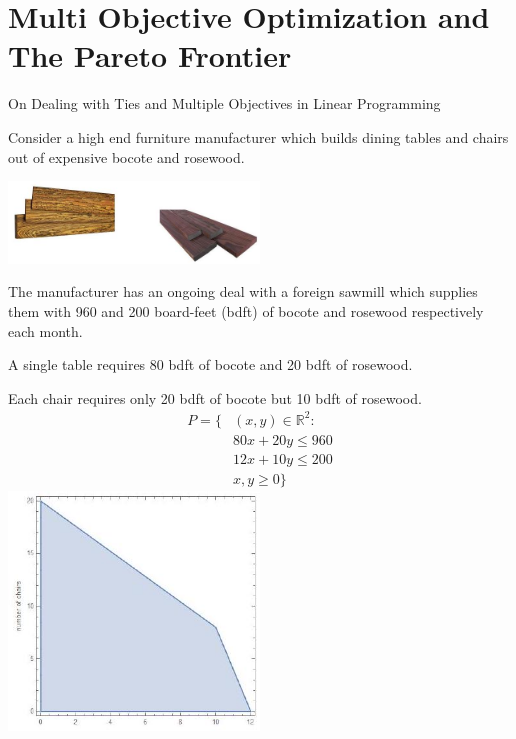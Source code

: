 %
%
\section{Multi Objective Optimization and The Pareto Frontier}
On Dealing with Ties and Multiple Objectives in Linear Programming



Consider a high end furniture manufacturer which builds dining tables and chairs out of expensive bocote and rosewood.

\includegraphics[width=0.5\textwidth]{optimization/multi-objective/images/2022_02_28_634e8079070800ac7e3cg-02}

The manufacturer has an ongoing deal with a foreign sawmill which supplies them with 960 and 200 board-feet (bdft) of bocote and rosewood respectively each month.

A single table requires 80 bdft of bocote and 20 bdft of rosewood.

Each chair requires only 20 bdft of bocote but 10 bdft of rosewood.
$$
\begin{aligned}
P=\{&(x, y) \in \mathbb{R}^{2}: \\
& 80 x+20 y \leq 960 \\
& 12 x+10 y \leq 200 \\
&x, y \geq 0\}
\end{aligned}
$$
\includegraphics[width=0.5\textwidth]{optimization/multi-objective/images/2022_02_28_634e8079070800ac7e3cg-03}

